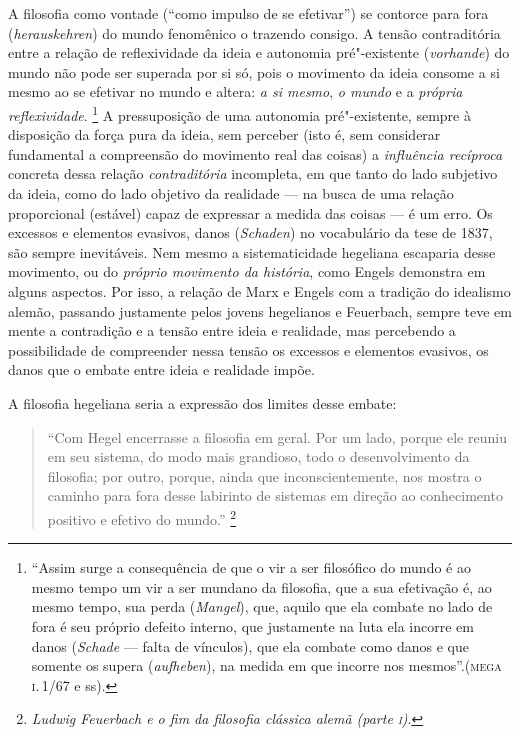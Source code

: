 A filosofia como vontade (``como impulso de se efetivar'') se contorce
para fora (\emph{herauskehren}) do mundo fenomênico o trazendo consigo.
A tensão contraditória entre a relação de reflexividade da ideia e
autonomia pré"-existente (\emph{vorhande}) do mundo não pode ser superada
por si só, pois o movimento da ideia consome a si mesmo ao se efetivar
no mundo e altera: \emph{a si mesmo}, \emph{o mundo} e a \emph{própria
reflexividade}. \footnote{``Assim surge a consequência de que o vir a
  ser filosófico do mundo é ao mesmo tempo um vir a ser mundano da
  filosofia, que a sua efetivação é, ao mesmo tempo, sua perda
  (\emph{Mangel}), que, aquilo que ela combate no lado de fora é seu
  próprio defeito interno, que justamente na luta ela incorre em danos
  (\emph{Schade} --- falta de vínculos), que ela combate como danos e que
  somente os supera (\emph{aufheben}), na medida em que incorre nos
  mesmos''.(\textsc{mega} \textsc{i}.\,1/67 e ss).} A pressuposição de uma autonomia
pré"-existente, sempre à disposição da força pura da ideia, sem perceber
(isto é, sem considerar fundamental a compreensão do movimento real das
coisas) a \emph{influência recíproca} concreta dessa relação
\emph{contraditória} incompleta, em que tanto do lado subjetivo da
ideia, como do lado objetivo da realidade --- na busca de uma relação
proporcional (estável) capaz de expressar a medida das coisas --- é um
erro. Os excessos e elementos evasivos, danos (\emph{Schaden}) no
vocabulário da tese de 1837, são sempre inevitáveis. Nem mesmo a
sistematicidade hegeliana escaparia desse movimento, ou do \emph{próprio
movimento da história}, como Engels demonstra em alguns aspectos. Por
isso, a relação de Marx e Engels com a tradição do idealismo alemão,
passando justamente pelos jovens hegelianos e Feuerbach, sempre teve em
mente a contradição e a tensão entre ideia e realidade, mas percebendo a
possibilidade de compreender nessa tensão os excessos e elementos
evasivos, os danos que o embate entre ideia e realidade impõe.

A filosofia hegeliana seria a expressão dos limites desse embate:

\begin{quote}
``Com Hegel
encerrasse a filosofia em geral. Por um lado, porque ele reuniu em seu
sistema, do modo mais grandioso, todo o desenvolvimento da filosofia;
por outro, porque, ainda que inconscientemente, nos mostra o caminho
para fora desse labirinto de sistemas em direção ao conhecimento
positivo e efetivo do mundo.'' \footnote{\emph{Ludwig Feuerbach e o fim
  da filosofia clássica alemã (parte \textsc{i})}.}
\end{quote}

